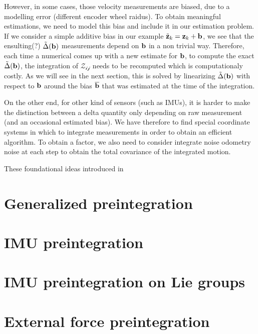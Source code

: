 However, in some cases, those velocity measurements are biased, due to a modelling error (different encoder wheel raidus). 
To obtain meaningful estimations, we need to model this bias and include it in our estimation problem. If we consider a simple additive bias in our example
$\tilde{{\bf z}}_k = {\bf z}_k + {\bf b}$, we see that the ensulting(?) $\tilde\Delta({\bf b})$ measurements depend on ${\bf b}$ in a non trivial way. Therefore,
each time a numerical comes up with a new estimate for ${\bf b}$, to compute the exact $\tilde\Delta({\bf b})$, the integration of $\mathcal{Z_{ij}}$ 
needs to be recomputed which is computationaly costly. As we will see in the next section, this is solved by linearizing $\tilde\Delta({\bf b})$ with respect to ${\bf b}$ around
the bias $\overline{{\bf b}}$ that was estimated at the time of the integration. 

On the other end, for other kind of sensors (such as IMUs), it is harder to make the distinction between a delta quantity only depending on raw measurement (and an occasional estimated bias).
We have therefore to find special coordinate systems in which to integrate measurements in order to obtain an efficient algorithm. To obtain a factor, we also need to consider integrate 
noise odometry noise at each step to obtain the total covariance of the integrated motion.

These foundational ideas introduced in \cite{lupton-09}
  

\section{Generalized preintegration}
\section{IMU preintegration}
\section{IMU preintegration on Lie groups}
\section{External force preintegration}